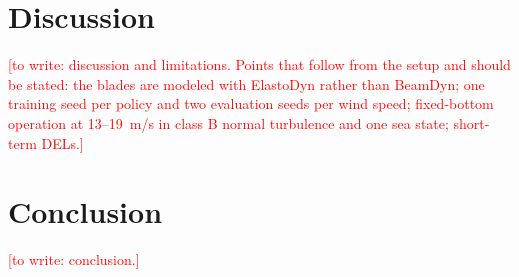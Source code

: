 \documentclass[journal]{IEEEtran}
\newcommand{\todo}[1]{\textcolor{red}{[to write: #1]}}
\begin{document}
\section{Discussion}
\todo{discussion and limitations. Points that follow from the setup and should be stated: the
blades are modeled with ElastoDyn rather than BeamDyn; one training seed per policy and two
evaluation seeds per wind speed; fixed-bottom operation at 13--19~m/s in class B normal turbulence
and one sea state; short-term DELs.}

\section{Conclusion}
\todo{conclusion.}



\end{document}
